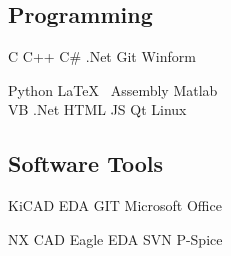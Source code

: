 \documentclass[]{deedy-resume-andrewvanhorn}
\begin{document}
\begin{minipage}[t]{0.33\textwidth}
\sectionsep


\section{}
\subsection{Programming}
C \textbullet{}  C++ \textbullet{} C\# .Net \textbullet{}
Git \textbullet{} Winform

Python \textbullet{} \LaTeX\ \textbullet{} Assembly \textbullet{}
Matlab \\ VB .Net \textbullet{} HTML \textbullet{} JS \textbullet{} Qt \textbullet{} Linux
\subsection{Software Tools}
KiCAD EDA \textbullet{} GIT \textbullet{} Microsoft Office

NX CAD \textbullet{} Eagle EDA \textbullet{} SVN \textbullet{} P-Spice

\sectionsep

%
%

\end{minipage} 
\hfill
\end{document}
